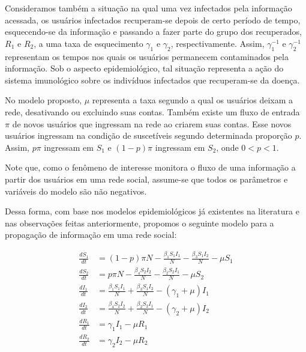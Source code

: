 \documentclass[
	12pt,				%
	openright,			%
	oneside,			%
	a4paper,			%
	english,			%
	french,				%
	spanish,			%
	brazil				%
	]{abntex2}
\begin{document}
Consideramos também a situação na qual uma vez infectados pela
informação acessada, os usuários infectados recuperam-se depois de
certo período de tempo, esquecendo-se da informação e passando a fazer
parte do grupo dos recuperados, $R_1$ e $R_2$, a uma taxa de
esquecimento $\gamma_1$ e $\gamma_2$, respectivamente. Assim,
$\gamma_1^{-1}$ e $\gamma_2^{-1}$ representam os tempos nos quais os usuários
permanecem contaminados pela informação. Sob o aspecto epidemiológico,
tal situação representa a ação do sistema imunológico sobre os
indivíduos infectados que recuperam-se da doença.

No modelo proposto, $\mu$ representa a taxa segundo a qual os usuários
deixam a rede, desativando ou excluindo suas contas. Também existe um
fluxo de entrada $\pi$ de novos usuários que ingressam na rede ao
criarem suas contas. Esse novos usuários ingressam na condição de
suscetíveis segundo determinada proporção $p$. Assim, $p\pi$ ingressam
em $S_1$ e $(1-p)\pi$ ingressam em $S_2$, onde $0 < p < 1$.

Note que, como o fenômeno de interesse monitora o fluxo de uma
informação a partir dos usuários em uma rede social, assume-se que
todos os parâmetros e variáveis do modelo são não negativos.

Dessa forma, com base nos modelos epidemiológicos já existentes na
literatura e nas observações feitas anteriormente, propomos o seguinte
modelo para a propagação de informação em uma rede social:

\begin{align}
  \frac{dS_1}{dt} &= (1-p)\pi N - \frac{\beta_1 S_1 I_1}{N} - \frac{\beta_3 S_1 I_2}{N} - \mu S_1 \nonumber \\
  \frac{dS_2}{dt} &= p\pi N - \frac{\beta_4 S_2 I_2}{N} - \frac{\beta_2 S_2 I_1}{N} - \mu S_2 \nonumber \\
  \frac{dI_1}{dt} &= \frac{\beta_1 S_1 I_1}{N} + \frac{\beta_3 S_1 I_2}{N} - (\gamma_1 + \mu)I_1 \nonumber \\
  \frac{dI_2}{dt} &= \frac{\beta_4 S_2 I_2}{N} + \frac{\beta_2 S_2 I_1}{N} - (\gamma_2 + \mu)I_2 \nonumber \\
  \frac{dR_1}{dt} &= \gamma_1 I_1 - \mu R_1 \nonumber \\
  \frac{dR_2}{dt} &= \gamma_2 I_2 - \mu R_2 \nonumber
\end{align}
\end{document}
